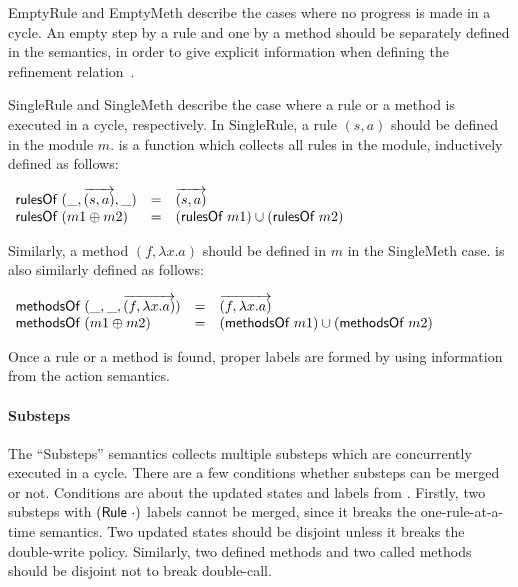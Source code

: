 EmptyRule and EmptyMeth describe the cases where no progress is made
in a cycle. An empty step by a rule and one by a method should be
separately defined in the \Substep{} semantics, in order to give
explicit information when defining the refinement
relation~\cite{murali-thesis}.

SingleRule and SingleMeth describe the case where a rule or a method
is executed in a cycle, respectively. In SingleRule, a rule $(s, a)$
should be defined in the module $m$.  is a function which
collects all rules in the module, inductively defined as follows:
\begin{definition}
  \label{def-rulesofm}
  \mbox{}
  \begin{center}
    \begin{math}
      \begin{array}{lcl}
        \textsf{rulesOf}\ (\_, \overrightarrow{(s, a)}, \_) & = & \overrightarrow{(s, a)}\\
        \textsf{rulesOf}\ (m1 \oplus m2) & = & (\textsf{rulesOf}\ m1) \cup (\textsf{rulesOf}\ m2)\\
      \end{array}
    \end{math}
  \end{center}
\end{definition}
Similarly, a method $(f, \lambda x.a)$ should be defined in $m$ in the
SingleMeth case.  is also similarly defined as follows:
\begin{definition}
  \label{def-methsof}
  \mbox{}
  \begin{center}
    \begin{math}
      \begin{array}{lcl}
        \textsf{methodsOf}\ (\_, \_, \overrightarrow{(f, \lambda x.a)}) & = & \overrightarrow{(f, \lambda x.a)} \\
        \textsf{methodsOf}\ (m1 \oplus m2) & = & (\textsf{methodsOf}\ m1) \cup (\textsf{methodsOf}\ m2)\\
      \end{array}
    \end{math}
  \end{center}
\end{definition}
Once a rule or a method is found, proper labels are formed by using
information from the action semantics.

\paragraph{Substeps}
The ``Substeps'' semantics collects multiple substeps which are
concurrently executed in a cycle. There are a few conditions whether
substeps can be merged or not. Conditions are about the updated states
and labels from \Substep{}. Firstly, two substeps with
$(\textsf{Rule}\ \cdot)$ labels cannot be merged, since it breaks the
one-rule-at-a-time semantics. Two updated states should be disjoint
unless it breaks the double-write policy. Similarly, two defined
methods and two called methods should be disjoint not to break
double-call.

